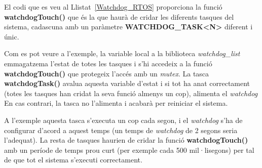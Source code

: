 El codi que es veu al Llistat~\ref{Watchdog_RTOS} proporciona la funció {\bf watchdogTouch()} que és la que haurà de cridar les diferents tasques del sistema, cadascuna amb un paràmetre {\bf WATCHDOG\_TASK<N>} diferent i únic.

Com es pot veure a l'exemple, la variable local a la biblioteca {\em watchdog\_list} emmagatzema l'estat de totes les tasques i s'hi accedeix a la funció {\bf watchdogTouch()} que protegeix l'accés amb un {\em mutex}. La tasca {\bf watchdogTask()} avalua aquesta variable d'estat i si tot ha anat correctament (totes les tasques han cridat la seva funció almenys un cop), alimenta el {\em watchdog} En cas contrari, la tasca no l'alimenta i acabarà per reiniciar el sistema.

A l'exemple aquesta tasca s'executa un cop cada segon, i el {\em watchdog} s'ha de configurar d'acord a aquest temps (un temps de {\em watchdog} de 2 segons seria l'adequat). La resta de tasques haurien de cridar la funció {\bf watchdogTouch()} amb un període de temps prou curt (per exemple cada 500 mil·lisegons) per tal de que tot el sistema s'executi correctament.
